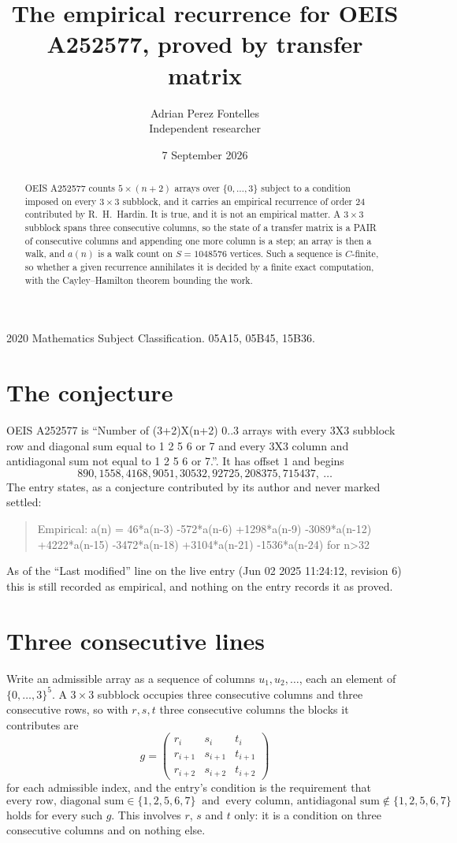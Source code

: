 \documentclass[11pt,a4paper]{article}
\title{The empirical recurrence for OEIS A252577, proved by transfer matrix}
\author{Adrian Perez Fontelles\\ \small Independent researcher}
\date{7 September 2026}
\theoremstyle{plain}
\theoremstyle{definition}
\begin{document}
\maketitle

\begin{abstract}
OEIS A252577 counts $5\times(n+2)$ arrays over $\{0,\dots,3\}$ subject to a condition imposed on
every $3\times3$ subblock, and it carries an empirical recurrence of order $24$
contributed by R.~H.~Hardin. It is true, and it is not an empirical matter. A $3\times3$
subblock spans three consecutive columns, so the state of a transfer matrix is a PAIR of
consecutive columns and appending one more column is a step; an array is then a walk, and
$a(n)$ is a walk count on $S=1048576$ vertices. Such a sequence is $C$-finite, so whether a given
recurrence annihilates it is decided by a finite exact computation, with the Cayley--Hamilton
theorem bounding the work.
\end{abstract}

\noindent\small 2020 Mathematics Subject Classification. 05A15, 05B45, 15B36.\normalsize

\section{The conjecture}

OEIS A252577 is ``Number of (3+2)X(n+2) 0..3 arrays with every 3X3 subblock row and diagonal sum equal to 1 2 5 6 or 7 and every 3X3 column and antidiagonal sum not equal to 1 2 5 6 or 7.''. It has offset $1$ and begins
\[
890, 1558, 4168, 9051, 30532, 92725, 208375, 715437,\ \dots
\]
The entry states, as a conjecture contributed by its author and never marked settled:
\begin{quote}
Empirical: a(n) = 46*a(n-3) -572*a(n-6) +1298*a(n-9) -3089*a(n-12) +4222*a(n-15) -3472*a(n-18) +3104*a(n-21) -1536*a(n-24) for n>32
\end{quote}
As of the ``Last modified'' line on the live entry (Jun 02 2025 11:24:12, revision 6) this is still
recorded as empirical, and nothing on the entry records it as proved.

\section{Three consecutive lines}

Write an admissible array as a sequence of columns $u_1,u_2,\dots$, each an element of
$\{0,\dots,3\}^{5}$. A $3\times3$ subblock occupies three consecutive columns and
three consecutive rows, so with $r,s,t$ three consecutive columns the blocks it
contributes are
\[
g=\begin{pmatrix}r_i&s_i&t_i\\ r_{i+1}&s_{i+1}&t_{i+1}\\ r_{i+2}&s_{i+2}&t_{i+2}\end{pmatrix}
\]
for each admissible index, and the entry's condition is the requirement that
\[
\text{every row, diagonal sum} \in \{1,2,5,6,7\}\ \text{ and }\ \text{every column, antidiagonal sum} \notin \{1,2,5,6,7\}
\]
holds for every such $g$. This involves $r$, $s$ and $t$ only: it is a condition on
three consecutive columns and on nothing else.
\end{document}
